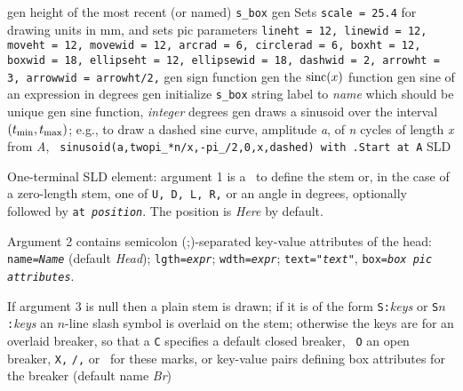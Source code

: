%
  {gen}%
  {height of the most recent (or named) {\tt s\_box}%
    }%
%
  {gen}%
  {Sets {\tt scale = 25.4} for drawing units in mm, and sets
   pic parameters {\tt lineht = 12, linewid = 12, moveht = 12,
    movewid = 12,
    arcrad = 6, circlerad = 6, boxht = 12, boxwid = 18, ellipseht = 12,
    ellipsewid = 18, dashwid = 2, arrowht = 3, arrowwid = arrowht/2,}}%
%
  {gen}%
  {sign function}%
%
  {gen}%
  {the $\hbox{sinc}(x)$ function}%
%
  {gen}%
  {sine of an expression in degrees}%
%
  {gen}%
  {initialize {\tt s\_box} string label to {\sl name} which should
  be unique
    }%
%
  {gen}%
  {sine function, {\sl integer\/} degrees}%
%
  {gen}%
  {draws a sinusoid over the interval $(t_{\hbox{\scriptsize min}},
  t_{\hbox{\scriptsize max}})$;
   e.g., to draw a dashed sine curve, amplitude {\sl a},
   of {\sl n} cycles of length {\sl x} from {\sl A}, {\tt
   sinusoid(a,twopi\_*n/x,-pi\_/2,0,x,dashed) with .Start at A}}%
%
  {SLD}%
  {One-terminal SLD element: argument 1 is a \linespec\ to define the stem
   or, in the case of a zero-length stem, one of {\tt U, D, L, R,} or an
   angle in degrees, optionally followed by {\tt at {\sl position}}.
   The position is {\sl Here} by default.

   Argument 2 contains semicolon (;)-separated key-value attributes
   of the head:
   {\tt name={\sl{}Name}} (default {\sl Head});
   {\tt lgth={\sl{}expr}};
   {\tt wdth={\sl{}expr}};
   {\tt text="{\sl{}text}"},
   {\tt box={\sl{}box pic attributes}}.

   If argument 3 is null then a plain stem is drawn; if it is of the
   form {\tt S:}{\sl keys} or {\tt S$n$:}{\sl keys} an $n$-line slash
   symbol is overlaid on the stem; otherwise the keys are for an overlaid
   breaker, so that a {\tt C} specifies a default closed breaker, {\tt
   O} an open breaker, {\tt X,} {\tt /,} or \bsl\ for these marks, or
    key-value pairs defining box attributes
   for the breaker (default name {\sl Br})

   }%
%
